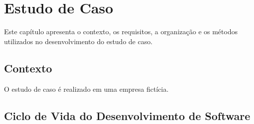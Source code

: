 \chapter{Estudo de Caso }
\label{cap:estudo_caso1}
Este capítulo apresenta o contexto, os requisitos, a organização e os métodos utilizados no desenvolvimento do estudo de caso.

\section{Contexto}
\label{section:contexto}
O estudo de caso é realizado em uma empresa fictícia.

\section{Ciclo de Vida do Desenvolvimento de Software}
